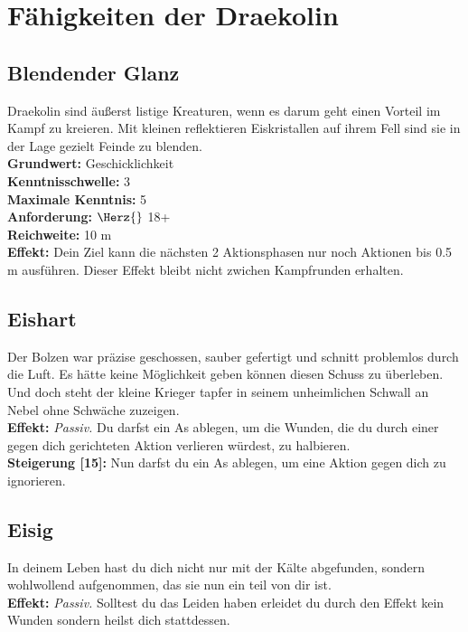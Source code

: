 
\section{Fähigkeiten der Draekolin} \label{draekolinskills}

\subsection*{Blendender Glanz} \label{sk:blendender_glanz}
Draekolin sind äußerst listige Kreaturen, wenn es darum geht einen Vorteil im Kampf zu kreieren. Mit kleinen reflektieren Eiskristallen auf ihrem Fell sind sie in der Lage gezielt Feinde zu blenden. \\
\textbf{Grundwert:} Geschicklichkeit \\
\textbf{Kenntnisschwelle:} 3 \\
\textbf{Maximale Kenntnis:} 5 \\
\textbf{Anforderung:} $\Herz{}$ 18+ \\
\textbf{Reichweite:} 10 m\\
\textbf{Effekt:} Dein Ziel kann die nächsten 2 Aktionsphasen nur noch Aktionen bis 0.5 m ausführen. Dieser Effekt bleibt nicht zwichen Kampfrunden erhalten.

\subsection*{Eishart} \label{sk:eishart}
Der Bolzen war präzise geschossen, sauber gefertigt und schnitt problemlos durch die Luft. Es hätte keine Möglichkeit geben können diesen Schuss zu überleben. Und doch steht der kleine Krieger tapfer in seinem unheimlichen Schwall an Nebel ohne Schwäche zuzeigen. \\
\textbf{Effekt:} \textit{Passiv.} Du darfst ein As ablegen, um die Wunden, die du durch einer gegen dich gerichteten Aktion verlieren würdest, zu halbieren.\\
\textbf{Steigerung [15]:} Nun darfst du ein As ablegen, um eine Aktion gegen dich zu ignorieren.

\subsection*{Eisig} \label{sk:eisig}
In deinem Leben hast du dich nicht nur mit der Kälte abgefunden, sondern wohlwollend aufgenommen, das sie nun ein teil von dir ist.\\
\textbf{Effekt:} \textit{Passiv.} Solltest du das Leiden  haben erleidet du durch den Effekt kein Wunden sondern heilst dich stattdessen.

